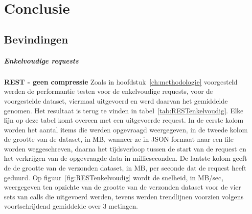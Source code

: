 
\chapter{Conclusie}%
\label{ch:conclusie}

\section{Bevindingen}
\paragraph{Enkelvoudige requests}
\textbf{REST - geen compressie}\newline
Zoals in hoofdstuk~\ref{ch:methodologie} voorgesteld werden de performantie testen voor de enkelvoudige requests, voor de voorgestelde dataset,
viermaal uitgevoerd en werd daarvan het gemiddelde genomen. Het resultaat is terug te vinden in tabel~\ref{tab:RESTenkelvoudig}.
Elke lijn op deze tabel komt overeen met een uitgevoerde request. In de eerste kolom worden het aantal items die werden opgevraagd weergegeven,
in de tweede kolom de grootte van de dataset, in MB, wanneer ze in JSON formaat naar een file worden weggeschreven,
daarna het tijdsverloop tussen de start van de request en het verkrijgen van de opgevraagde data in millieseconden. De laatste kolom geeft de de grootte van de
verzonden dataset, in MB, per seconde dat de request heeft geduurd.
Op figuur~\ref{fig:RESTenkelvoudig} wordt de snelheid, in MB/sec, weergegeven ten opzichte van de grootte van de verzonden dataset voor de vier sets van
calls die uitgevoerd werden, tevens werden trendlijnen voorzien volgens voortschrijdend gemiddelde over 3 metingen.\\

